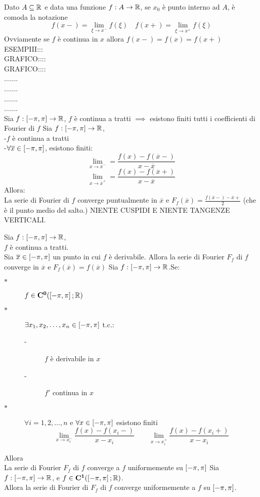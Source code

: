 \observation
Dato $A\subseteq \mathbb{R}$ e data una funzione $f:A \to \mathbb{R}$, se $x_0$ è punto interno ad $A$, è comoda la notazione
\[f(x-)=\lim\limits_{\xi\to x^{-}}f(\xi)\quad f(x+)=\lim\limits_{\xi\to x^{+}}f(\xi)\]
Ovviamente se $f$ è continua in $x$ allora $f(x-)=f(x)=f(x+)$
ESEMPIII:::\\
GRAFICO::::\\
GRAFICO::::\\
.......\\
.......\\
.......\\
.......\\
\proposition
Sia $f: \left[-\pi,\pi\right] \to \mathbb{R}$, $f$ è continua a tratti $\implies$ esistono finiti tutti i coefficienti di Fourier di $f$
\proposition
Sia $f: \left[-\pi,\pi\right] \to \mathbb{R}$,\\
-$f$ è continua a tratti\\
-$\forall \overline{x} \in\left[-\pi,\pi\right]$, esistono finiti:\\
\[ \lim\limits_{x\to\overline{x}^{-}}=\frac{f(x)-f(\overline{x}-)}{x-\overline{x}} \]
\[ \lim\limits_{x\to\overline{x}^{+}}=\frac{f(x)-f(\overline{x}+)}{x-\overline{x}} \]
Allora:\\
La serie di Fourier di $f$ converge puntualmente in $\overline{x}$ e $F_f(\overline{x})=\frac{f(\overline{x}-)-\overline{x}+}{2}$ (che è il punto medio del salto.)
\observation NIENTE CUSPIDI E NIENTE TANGENZE VERTICALI.

\corollary
Sia $f: \left[-\pi,\pi\right] \to \mathbb{R}$,\\
$f$ è continua a tratti.\\
Sia $\overline{x}\in\left[-\pi,\pi\right]$ un punto in cui $f$ è derivabile. Allora la serie di Fourier $F_f$ di $f$ converge in $\overline{x}$ e $F_f(\overline{x})=f(\overline{x})$
\proposition
Sia $f: \left[-\pi,\pi\right] \to \mathbb{R}$.Se:\\
\begin{description}
	\item[$\ast$] $f\in \mathbf{C^{0}}(\left[-\pi,\pi\right]; \mathbb{R})$
	\item[$\ast$] $\exists x_1,x_2,\dotsc,x_n\in\left[-\pi,\pi\right]$ t.c.:
	\begin{description}
		\item[-] $f$ è derivabile in $x$
		\item[-] $f'$ continua in $x$
	\end{description}
	\item[$\ast$] $\forall i=1,2,\dotsc,n$ e $\forall x\in\left[-\pi,\pi\right]$ esistono finiti
	\[\lim\limits_{x\to x_i^{-}}\frac{f(x)-f(x_i-)}{x-x_i}\qquad \lim\limits_{x\to x_i^{+}}\frac{f(x)-f(x_i+)}{x-x_i}\]

\end{description}
Allora\\
La serie di Fourier $F_f$ di $f$ converge a $f$ uniformemente su $\left[-\pi,\pi\right]$
\corollary
Sia $f: \left[-\pi,\pi\right] \to \mathbb{R}$, e $f\in \mathbf{C^{1}}(\left[-\pi,\pi\right]; \mathbb{R})$.\\
Allora la serie di Fourier di $F_f$ di $f$ converge uniformemente a $f$ su $\left[-\pi,\pi\right]$.